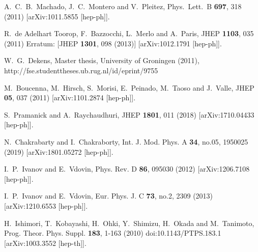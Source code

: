 \documentclass[11pt]{article}
\begin{document}
\begin{thebibliography}{99}
A.~C.~B.~Machado, J.~C.~Montero and V.~Pleitez,
Phys.\ Lett.\ B {\bf 697}, 318 (2011)
[arXiv:1011.5855 [hep-ph]].

R.~de Adelhart Toorop, F.~Bazzocchi, L.~Merlo and A.~Paris,
JHEP {\bf 1103}, 035 (2011)
Erratum: [JHEP {\bf 1301}, 098 (2013)]
[arXiv:1012.1791 [hep-ph]].

W.~G.~Dekens, 
Master thesis, University of Groningen (2011),  
http://fse.studenttheses.ub.rug.nl/id/eprint/9755

M.~Boucenna, M.~Hirsch, S.~Morisi, E.~Peinado, M.~Taoso and J.~Valle,
JHEP \textbf{05}, 037 (2011)
[arXiv:1101.2874 [hep-ph]].


S.~Pramanick and A.~Raychaudhuri,
JHEP {\bf 1801}, 011 (2018)
[arXiv:1710.04433 [hep-ph]].

N.~Chakrabarty and I.~Chakraborty,
Int. J. Mod. Phys. A \textbf{34}, no.05, 1950025 (2019)
[arXiv:1801.05272 [hep-ph]].


I.~P.~Ivanov and E.~Vdovin,
Phys. Rev. D \textbf{86}, 095030 (2012)
[arXiv:1206.7108 [hep-ph]].

I.~P.~Ivanov and E.~Vdovin,
Eur. Phys. J. C \textbf{73}, no.2, 2309 (2013)
[arXiv:1210.6553 [hep-ph]].

H.~Ishimori, T.~Kobayashi, H.~Ohki, Y.~Shimizu, H.~Okada and M.~Tanimoto,
Prog. Theor. Phys. Suppl. \textbf{183}, 1-163 (2010)
doi:10.1143/PTPS.183.1
[arXiv:1003.3552 [hep-th]].


\end{thebibliography}
\end{document}
